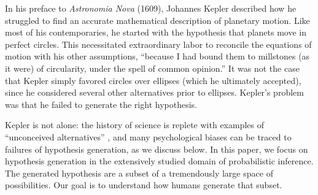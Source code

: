 
In his preface to \emph{Astronomia Nova} (1609), Johannes Kepler described how he struggled to find an accurate mathematical description of planetary motion. Like most of his contemporaries, he started with the hypothesis that planets move in perfect circles. This necessitated extraordinary labor to reconcile the equations of motion with his other assumptions, ``because I had bound them to millstones (as it were) of circularity, under the spell of common opinion.'' It was not the case that Kepler simply favored circles over ellipses (which he ultimately accepted), since he considered several other alternatives prior to ellipses. Kepler's problem was that he failed to generate the right hypothesis.


Kepler is not alone: the history of science is replete with examples of ``unconceived alternatives'' \citep{stanford10}, and many psychological biases can be traced to failures of hypothesis generation, as we discuss below. In this paper, we focus on hypothesis generation in the extensively studied domain of probabilistic inference. The generated hypothesis are a subset of a tremendously large space of possibilities. Our goal is to understand how humans generate that subset.

